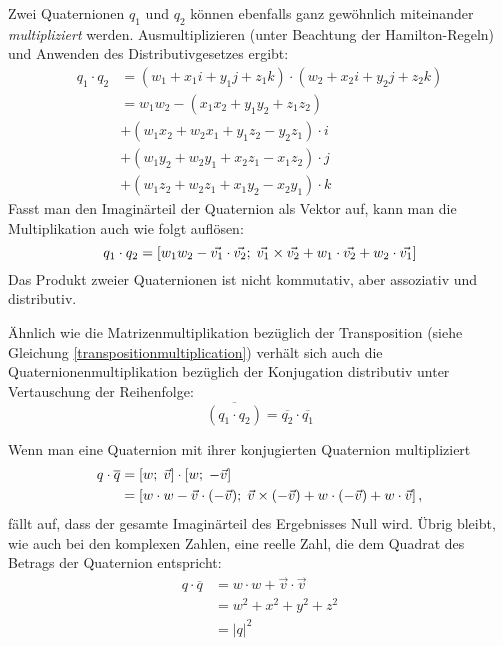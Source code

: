 Zwei Quaternionen $q_1$ und $q_2$ können ebenfalls ganz gewöhnlich miteinander \emph{multipliziert} werden. Ausmultiplizieren (unter Beachtung der Hamilton-Regeln) und Anwenden des Distributivgesetzes ergibt:
\begin{equation}
\begin{split}
 q_1 \cdot q_2 &= ( w_1 + x_{1}i + y_{1}j + z_{1}k ) \cdot ( w_2 + x_{2}i + y_{2}j + z_{2}k ) \\
 &= w_1 w_2 - ( x_1 x_2 + y_1 y_2 + z_1 z_2 ) \\
    & + ( w_1 x_2 + w_2 x_1 + y_1 z_2 - y_2 z_1 ) \cdot i \\
    & + ( w_1 y_2 + w_2 y_1 + x_2 z_1 - x_1 z_2 ) \cdot j \\
    & + ( w_1 z_2 + w_2 z_1 + x_1 y_2 - x_2 y_1 ) \cdot k
\end{split}
\end{equation}
Fasst man den Imaginärteil der Quaternion als Vektor auf, kann man die Multiplikation auch wie folgt auflösen:
\begin{equation}
 \label{quaternionmultiplicationvector}
 q_1 \cdot q_2 = \left[ w_1 w_2 - \vec{v_1} \cdot \vec{v_2} ;\; \vec{v_1} \times \vec{v_2} + w_1 \cdot \vec{v_2} + w_2 \cdot \vec{v_1} \right]
\end{equation}
Das Produkt zweier Quaternionen ist nicht kommutativ, aber assoziativ und distributiv.

Ähnlich wie die Matrizenmultiplikation bezüglich der Transposition (siehe Gleichung \ref{transpositionmultiplication}) verhält sich auch die Quaternionenmultiplikation bezüglich der Konjugation distributiv unter Vertauschung der Reihenfolge:
\begin{equation}
 \label{quaternionconjugationmultiplication}
 \overline{( q_1 \cdot q_2 )} = \overline{q_2} \cdot \overline{q_1}
\end{equation} 

Wenn man eine Quaternion mit ihrer konjugierten Quaternion multipliziert
\begin{equation}
\begin{split}
 q \cdot \overline{q} &= \left[ w ;\; \vec v \right] \cdot \left[ w ;\; -\vec v \right] \\
 & = \left[ w \cdot w - \vec{v} \cdot (-\vec{v}) ;\; \vec{v} \times (-\vec{v}) + w \cdot \left(-\vec{v}\right) + w \cdot \vec{v} \right],
\end{split}
\end{equation}
fällt auf, dass der gesamte Imaginärteil des Ergebnisses Null wird. Übrig bleibt, wie auch bei den komplexen Zahlen, eine reelle Zahl, die dem Quadrat des Betrags der Quaternion entspricht:
\begin{equation}
\begin{split}
 q \cdot \overline{q} &= w \cdot w + \vec v \cdot \vec v \\
 &= w^2 + x^2 + y^2 + z^2 \\
 &= \left| q \right|^2
\end{split}
\end{equation}

